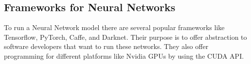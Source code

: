 \documentclass[conference]{IEEEtran}
\begin{document}
\begin{table}[htb]
    \centering
    \linebreak
    \caption{Popular activation functions}
    \label{table:AF}
	\vspace{\abovecaptionskip}
\end{table}



 \subsection{Frameworks for Neural Networks}
 \label{section:Darknet}

To run a Neural Network model there are several popular frameworks like
Tensorflow, PyTorch, Caffe, and Darknet.  Their purpose is to offer abstraction
to software developers that want to run these networks. They also offer
programming for different platforms like Nvidia GPUs by using the CUDA API.
\end{document}

